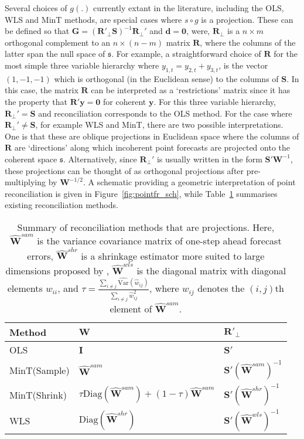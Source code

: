 \documentclass[12pt]{article}
\def\var{\text{Var}}
\theoremstyle{definition}
\begin{document}
Several choices of $g(.)$ currently extant in the literature, including the OLS, WLS and MinT methods, are special cases where $s\circ g$ is a projection. These can be defined so that $\bm{G}=({\bm{R}'_{\perp}}\bm{S})^{-1}\bm{R}_{\perp}'$ and $\bm{d}=\bm{0}$, were, ${\bm{R}_{\perp}}$ is a $n\times m$ orthogonal complement to an $n \times (n-m)$ matrix $\bm{R}$, where the columns of the latter span the null space of $\mathfrak{s}$. For example, a straightforward choice of $\bm{R}$ for the most simple three variable hierarchy where $y_{1,t}=y_{2,t}+y_{3,t}$, is the vector $(1,-1,-1)$ which is orthogonal (in the Euclidean sense) to the columns of $\bm{S}$. In this case, the matrix $\bm{R}$ can be interpreted as a `restrictions' matrix since it has the property that $\bm{R}'\bm{y}=\bm{0}$ for coherent $\bm{y}$. For this three variable hierarchy, $\bm{R}_\perp'=\bm{S}$ and reconciliation corresponds to the OLS method. For the case where $\bm{R}_\perp'\neq\bm{S}$, for example WLS and MinT, there are two possible interpretations. One is that these are oblique projections in Euclidean space where the columns of $\bm{R}$ are `directions' along which incoherent point forecasts are projected onto the coherent space $\mathfrak{s}$. Alternatively, since $\bm{R}_\perp'$ is usually written in the form $\bm{S}'{\bm{W}}^{-1}$, these projections can be thought of as orthogonal projections after pre-multiplying by ${\bm{W}^{-1/2}}$. A schematic providing a geometric interpretation of point reconciliation is given in Figure~\ref{fig:pointfr_sch}, while Table~\ref{table:2} summarises existing reconciliation methods.

\begin{table}[!h]
	\caption{Summary of reconciliation methods that are projections. Here, $\hat{\bm{W}}^{sam}$ is the variance covariance matrix of one-step ahead forecast errors, $\hat{\bm{W}}^{shr}$ is a shrinkage estimator more suited to large dimensions proposed by \citet{Schafer2005}, $\hat{\bm{W}}^{wls}$ is the diagonal matrix with diagonal elements $w_{ii}$, and $\tau = \frac{\sum_{i \neq j}\hat{\var}(\hat{w}_{ij})}{\sum_{i \neq j}{\hat{w}}^2_{ij}}$, where $w_{ij}$ denotes the $(i,j)$th element of $\hat{\bm{W}}^{sam}$.}\label{table:2}
	\centering
	\begin{tabular}{lll}
		\toprule
		\textbf{Method} & \textbf{$\bm{W}$} & \textbf{ $\bm{R}'_\bot$}      \\
		\midrule
		OLS             &
		$\bm{I}$  &
		$\bm{S}'$  \\
		MinT(Sample)    &
		$\hat{\bm{W}}^{sam}$ &
		$\bm{S}'(\hat{\bm{W}}^{sam})^{-1}$ \\
		MinT(Shrink)    &
		$\tau\text{Diag}(\hat{\bm{W}}^{sam}) + (1-\tau)\hat{\bm{W}}^{sam}$ &
		$\bm{S}'(\hat{\bm{W}}^{shr})^{-1}$ \\
		WLS       &
		$\text{Diag}(\hat{\bm{W}}^{shr})$ &
		$\bm{S}'(\hat{\bm{W}}^{wls})^{-1}$ \\
		\bottomrule
	\end{tabular}
\end{table}
\end{document}
